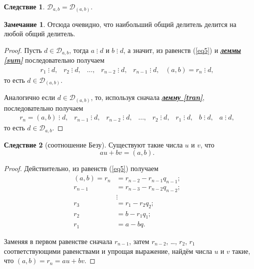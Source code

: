 \documentclass[14pt, a4paper]{extarticle}
\theoremstyle{definition}
\newtheorem*{remark}{Замечание}
\newtheorem{corollary}{Следствие}[theorem]
\newcommand{\divisible}{\mathop{\vdots}}
\begin{document}
	\begin{corollary}
	\label{mndel}
		$\mathcal{D}_{a,b}=\mathcal{D}_{(a,b)}$.
	\end{corollary}
	\begin{remark}
		Отсюда очевидно, что наибольший общий делитель делится на любой общий делитель.
	\end{remark}
	\begin{proof}
		Пусть $d\in\mathcal{D}_{a,b}$, тогда $a\divisible d$ и $b\divisible d$, а значит, из равенств (\ref{eq5}) и \hyperref[sum]{\textbf{\textit{леммы \ref*{sum}}}} последовательно получаем
		$$\begin{array}{cccccc}
		r_1\divisible d,&r_2\divisible d,&\dots,&r_{n-2}\divisible d,&r_{n-1}\divisible d,&(a,b)=r_n\divisible d,
		\end{array}$$
		то есть $d\in\mathcal{D}_{(a,b)}$.
		
		Аналогично если $d\in\mathcal{D}_{(a,b)}$, то, используя сначала \hyperref[tran]{\textbf{\textit{лемму \ref*{tran}}}}, последовательно получаем
		$$\begin{array}{cccccccc}
			r_n=(a,b)\divisible d,&r_{n-1}\divisible d,&r_{n-2}\divisible d,&\dots,&r_2\divisible d,&r_1\divisible d,&b\divisible d,&a\divisible d,
		\end{array}$$
		то есть $d\in\mathcal{D}_{a,b}$.
	\end{proof}

	\begin{corollary}[соотношение Безу]
	\label{bezu}
		Существуют такие числа $u$ и $v$, что $$\boxed{au+bv=(a,b).}$$
	\end{corollary}
	\begin{proof}
		Действительно, из равенств (\ref{eq5}) получаем
		\begin{align*}
			(a,b)=r_n&=r_{n-2}-r_{n-1}q_{n-1};\\
			r_{n-1}&=r_{n-3}-r_{n-2}q_{n-2};\\
			&\vdots\\
			r_3&=r_1-r_2q_2;\\
			r_2&=b-r_1q_1;\\
			r_1&=a-bq.
		\end{align*}
		
		Заменяя в первом равенстве сначала $r_{n-1}$, затем $r_{n-2}$, \dots, $r_2$, $r_1$ соответствующими равенствами и упрощая выражение, найдём числа $u$ и $v$ такие, что $(a,b)=r_n=au+bv$.
	\end{proof}
\end{document}
